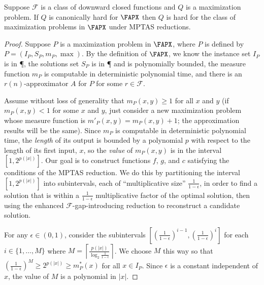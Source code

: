 \documentclass{article}
\newcommand{\ceil}[1]{\left\lceil#1\right\rceil}
\begin{document}
\begin{theorem}[{\cite[Theorem~2]{ep06}}]\label{thm:hardness}
  Suppose $\mathcal{F}$ is a class of downward closed functions and $Q$ is a maximization problem.
  If $Q$ is canonically hard for $\FAPX$ then $Q$ is hard for the class of maximization problems in $\FAPX$ under MPTAS reductions.
\end{theorem}
\begin{proof}
  Suppose $P$ is a maximization problem in $\FAPX$, where $P$ is defined by $P = (I_P, S_P, m_P, \max)$.
  By the definition of $\FAPX$, we know the instance set $I_P$ is in \P, the solutions set $S_P$ is in \P{} and is polynomially bounded, the measure function $m_P$ is computable in deterministic polynomial time, and there is an $r(n)$-approximator $A$ for $P$ for some $r \in \mathcal{F}$.

  Assume without loss of generality that $m_P(x, y) \geq 1$ for all $x$ and $y$ (if $m_P(x, y) < 1$ for some $x$ and $y$, just consider a new maximization problem whose measure function is $m'_P(x, y) = m_P(x, y) + 1$; the approximation results will be the same).
  Since $m_P$ is computable in deterministic polynomial time, the \emph{length} of its output is bounded by a polynomial $p$ with respect to the length of its first input, $x$, so the \emph{value} of $m_P(x, y)$ is in the interval $[1, 2^{p(|x|)}]$.
  Our goal is to construct functions $f$, $g$, and $c$ satisfying the conditions of the MPTAS reduction.
  We do this by partitioning the interval $[1, 2^{p(|x|)}]$ into subintervals, each of ``multiplicative size'' $\frac{1}{1 - \epsilon}$, in order to find a solution that is within a $\frac{1}{1 - \epsilon}$ multiplicative factor of the optimal solution, then using the enhanced $\mathcal{F}$-gap-introducing reduction to reconstruct a candidate solution.

  For any $\epsilon \in (0, 1)$, consider the subintervals $\left[\left(\frac{1}{1 - \epsilon}\right)^{i - 1}, \left(\frac{1}{1 - \epsilon}\right)^i\right]$ for each $i \in \{1, \dotsc, M\}$ where $M = \ceil{\frac{p(|x|)}{\log_2{\frac{1}{1 - \epsilon}}}}$.
  We choose $M$ this way so that $\left(\frac{1}{1 - \epsilon}\right)^M \geq 2^{p(|x|)} \geq m_P^*(x)$ for all $x \in I_P$.
  Since $\epsilon$ is a constant independent of $x$, the value of $M$ is a polynomial in $|x|$.


\end{proof}
\end{document}
